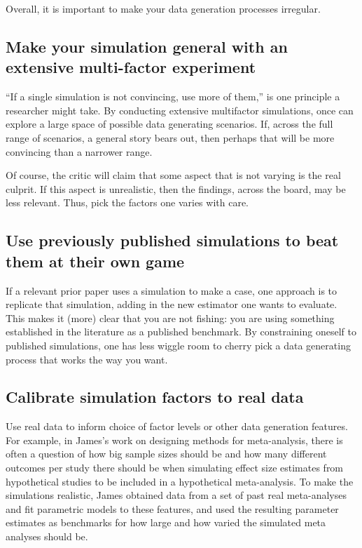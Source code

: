 \documentclass[
]{book}
\begin{document}
Overall, it is important to make your data generation processes irregular.

\subsection{Make your simulation general with an extensive multi-factor experiment}\label{make-your-simulation-general-with-an-extensive-multi-factor-experiment}

``If a single simulation is not convincing, use more of them,'' is one principle a researcher might take.
By conducting extensive multifactor simulations, once can explore a large space of possible data generating scenarios.
If, across the full range of scenarios, a general story bears out, then perhaps that will be more convincing than a narrower range.

Of course, the critic will claim that some aspect that is not varying is the real culprit.
If this aspect is unrealistic, then the findings, across the board, may be less relevant.
Thus, pick the factors one varies with care.

\subsection{Use previously published simulations to beat them at their own game}\label{use-previously-published-simulations-to-beat-them-at-their-own-game}

If a relevant prior paper uses a simulation to make a case, one approach is to replicate that simulation, adding in the new estimator one wants to evaluate.
This makes it (more) clear that you are not fishing: you are using something established in the literature as a published benchmark.
By constraining oneself to published simulations, one has less wiggle room to cherry pick a data generating process that works the way you want.

\subsection{Calibrate simulation factors to real data}\label{calibrate-simulation-factors-to-real-data}

Use real data to inform choice of factor levels or other data generation features.
For example, in James's work on designing methods for meta-analysis, there is often a question of how big sample sizes should be and how many different outcomes per study there should be when simulating effect size estimates from hypothetical studies to be included in a hypothetical meta-analysis.
To make the simulations realistic, James obtained data from a set of past real meta-analyses and fit parametric models to these features, and used the resulting parameter estimates as benchmarks for how large and how varied the simulated meta analyses should be.
\end{document}
